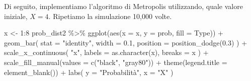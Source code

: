 \documentclass[
  11pt,
]{krantz}
\makeatletter
\newenvironment{Shaded}{\begin{snugshade}}{\end{snugshade}}
\newcommand{\AttributeTok}[1]{\textcolor[rgb]{0.61,0.61,0.61}{#1}}
\newcommand{\DecValTok}[1]{\textcolor[rgb]{0.06,0.06,0.06}{#1}}
\newcommand{\FloatTok}[1]{\textcolor[rgb]{0.06,0.06,0.06}{#1}}
\newcommand{\FunctionTok}[1]{\textcolor[rgb]{0,0,0}{#1}}
\newcommand{\NormalTok}[1]{#1}
\newcommand{\OtherTok}[1]{\textcolor[rgb]{0.37,0.37,0.37}{#1}}
\newcommand{\SpecialCharTok}[1]{\textcolor[rgb]{0,0,0}{#1}}
\newcommand{\StringTok}[1]{\textcolor[rgb]{0.5,0.5,0.5}{#1}}
\newenvironment{kframe}{%
\medskip{}
\setlength{\fboxsep}{.8em}
 \def\at@end@of@kframe{}%
 \ifinner\ifhmode%
  \def\at@end@of@kframe{\end{minipage}}%
  \begin{minipage}{\columnwidth}%
 \fi\fi%
 \def\FrameCommand##1{\hskip\@totalleftmargin \hskip-\fboxsep
 \colorbox{shadecolor}{##1}\hskip-\fboxsep
     \hskip-\linewidth \hskip-\@totalleftmargin \hskip\columnwidth}%
 \MakeFramed {\advance\hsize-\width
   \@totalleftmargin\z@ \linewidth\hsize
   \@setminipage}}%
 {\par\unskip\endMakeFramed%
 \at@end@of@kframe}
\renewenvironment{Shaded}{\begin{kframe}}{\end{kframe}}
\theoremstyle{definition}
\theoremstyle{definition}
\theoremstyle{definition}
\theoremstyle{definition}
\theoremstyle{remark}
\makeatother
\begin{document}
Di seguito, implementiamo l'algoritmo di Metropolis utilizzando, quale valore iniziale, \(X=4\). Ripetiamo la simulazione 10,000 volte.

\begin{Shaded}
\end{Shaded}

\begin{Shaded}
\begin{Highlighting}[]
\NormalTok{x }\OtherTok{\textless{}{-}} \DecValTok{1}\SpecialCharTok{:}\DecValTok{8}
\NormalTok{prob\_dist2 }\SpecialCharTok{\%\textgreater{}\%}
  \FunctionTok{ggplot}\NormalTok{(}\FunctionTok{aes}\NormalTok{(}\AttributeTok{x =}\NormalTok{ x, }\AttributeTok{y =}\NormalTok{ prob, }\AttributeTok{fill =}\NormalTok{ Type)) }\SpecialCharTok{+}
  \FunctionTok{geom\_bar}\NormalTok{(}
    \AttributeTok{stat =} \StringTok{"identity"}\NormalTok{,}
    \AttributeTok{width =} \FloatTok{0.1}\NormalTok{,}
    \AttributeTok{position =} \FunctionTok{position\_dodge}\NormalTok{(}\FloatTok{0.3}\NormalTok{)}
\NormalTok{  ) }\SpecialCharTok{+}
  \FunctionTok{scale\_x\_continuous}\NormalTok{(}
    \StringTok{"x"}\NormalTok{,}
    \AttributeTok{labels =} \FunctionTok{as.character}\NormalTok{(x),}
    \AttributeTok{breaks =}\NormalTok{ x}
\NormalTok{  ) }\SpecialCharTok{+}
  \FunctionTok{scale\_fill\_manual}\NormalTok{(}\AttributeTok{values =} \FunctionTok{c}\NormalTok{(}\StringTok{"black"}\NormalTok{, }\StringTok{"gray80"}\NormalTok{)) }\SpecialCharTok{+}
  \FunctionTok{theme}\NormalTok{(}\AttributeTok{legend.title =} \FunctionTok{element\_blank}\NormalTok{()) }\SpecialCharTok{+}
  \FunctionTok{labs}\NormalTok{(}
    \AttributeTok{y =} \StringTok{"Probabilità"}\NormalTok{,}
    \AttributeTok{x =} \StringTok{"X"}
\NormalTok{  )}
\end{Highlighting}
\end{Shaded}
\end{document}
